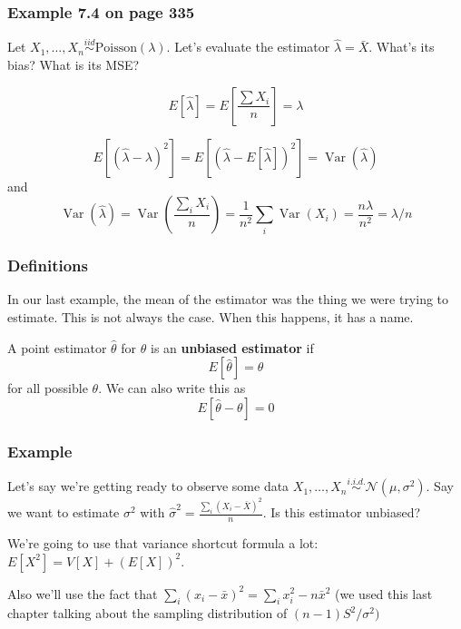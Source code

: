 \documentclass{beamer}
\begin{document}
\begin{frame}
\frametitle{Example 7.4 on page 335}

Let $X_1, \ldots, X_n \overset{iid}{\sim} \text{Poisson}(\lambda)$. Let's evaluate the estimator $\hat{\lambda} = \bar{X}$. What's its bias? What is its MSE?
\pause
\newline

\[
E[\hat{\lambda}] = E\left[ \frac{\sum X_i}{n}  \right] =  \lambda 
\]
\pause

\[
E[(\hat{\lambda} - \lambda)^2] = E[(\hat{\lambda} - E[\hat{\lambda}] )^2] = \operatorname{Var}(\hat{\lambda}) 
\]
and
\[
\operatorname{Var}(\hat{\lambda}) = \operatorname{Var}\left( \frac{\sum_i X_i }{n} \right) = \frac{1}{n^2}\sum_i \operatorname{Var}(X_i)   = \frac{n \lambda }{n^2} = \lambda/n
\]

\end{frame}






\begin{frame}
\frametitle{Definitions}

In our last example, the mean of the estimator was the thing we were trying to estimate. This is not always the case. When this happens, it has a name.
\newline

A point estimator $\hat{\theta}$ for $\theta$ is an \textbf{unbiased estimator} if 
\[
E[\hat{\theta}] = \theta
\]
for all possible $\theta$. We can also write this as 
\[
E[\hat{\theta} - \theta] = 0
\]

\end{frame}

\begin{frame}
\frametitle{Example}

Let's say we're getting ready to observe some data $X_1, \ldots, X_n \overset{i.i.d.}{\sim} \mathcal{N}(\mu, \sigma^2)$. Say we want to estimate $\sigma^2$ with $\hat{\sigma}^2 = \frac{\sum_i (X_i - \bar{X})^2 }{n}$. Is this estimator unbiased?
\newline

We're going to use that variance shortcut formula a lot: $E[X^2] = V[X] + (E[X])^2$. 
\newline

Also we'll use the fact that $\sum_i(x_i - \bar{x})^2 = \sum_i x_i^2 - n \bar{x}^2$ (we used this last chapter talking about the sampling distribution of $(n-1)S^2/\sigma^2)$

\end{frame}
\end{document}
